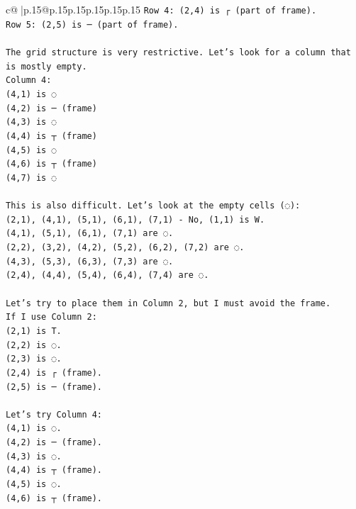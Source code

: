 \documentclass{article}
\begin{document}
{\begin{supertabular}{c@{$\;$}|p{.15\linewidth}@{}p{.15\linewidth}p{.15\linewidth}p{.15\linewidth}p{.15\linewidth}p{.15\linewidth}}
{{{\texttt{Row 4: (2,4) is ┌ (part of frame).} \\
\texttt{Row 5: (2,5) is ─ (part of frame).} \\
\\ 
\texttt{The grid structure is very restrictive. Let's look for a column that is mostly empty.} \\
\texttt{Column 4:} \\
\texttt{(4,1) is ◌} \\
\texttt{(4,2) is ─ (frame)} \\
\texttt{(4,3) is ◌} \\
\texttt{(4,4) is ┬ (frame)} \\
\texttt{(4,5) is ◌} \\
\texttt{(4,6) is ┬ (frame)} \\
\texttt{(4,7) is ◌} \\
\\ 
\texttt{This is also difficult. Let's look at the empty cells (◌):} \\
\texttt{(2,1), (4,1), (5,1), (6,1), (7,1) {-} No, (1,1) is W.} \\
\texttt{(4,1), (5,1), (6,1), (7,1) are ◌.} \\
\texttt{(2,2), (3,2), (4,2), (5,2), (6,2), (7,2) are ◌.} \\
\texttt{(4,3), (5,3), (6,3), (7,3) are ◌.} \\
\texttt{(2,4), (4,4), (5,4), (6,4), (7,4) are ◌.} \\
\\ 
\texttt{Let's try to place them in Column 2, but I must avoid the frame.} \\
\texttt{If I use Column 2:} \\
\texttt{(2,1) is T.} \\
\texttt{(2,2) is ◌.} \\
\texttt{(2,3) is ◌.} \\
\texttt{(2,4) is ┌ (frame).} \\
\texttt{(2,5) is ─ (frame).} \\
\\ 
\texttt{Let's try Column 4:} \\
\texttt{(4,1) is ◌.} \\
\texttt{(4,2) is ─ (frame).} \\
\texttt{(4,3) is ◌.} \\
\texttt{(4,4) is ┬ (frame).} \\
\texttt{(4,5) is ◌.} \\
\texttt{(4,6) is ┬ (frame).} \\
}}}
\end{supertabular}}
\end{document}
